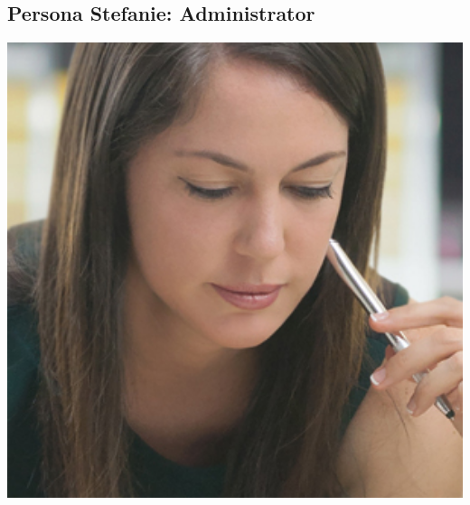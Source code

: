 \newpage

\subsection{Persona Stefanie: Administrator}
\begin{minipage}{0.25\textwidth}%
\centering
	\includegraphics[width=1\textwidth]{images/persona-stefanie.jpg}
	\label{fig:stefanie}
\end{minipage}
\hfill %
